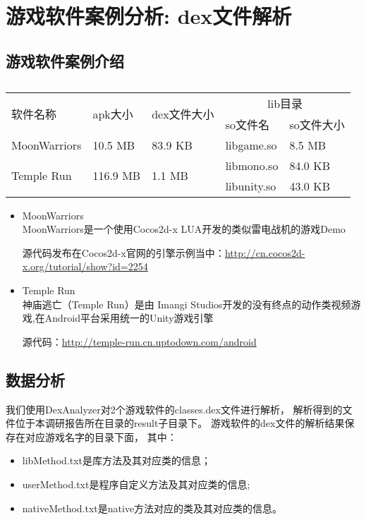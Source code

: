 \section{游戏软件案例分析: dex文件解析}
\label{dexanalysis}
\subsection{游戏软件案例介绍}
\label{sec:dexanalysis:case}
\begin{table}[H]
\caption{}
\begin{tabular}{|p{2.5cm}|p{2cm}|p{2.1cm}|p{2cm}|p{2cm}|}
\hline
\multirow{2}{*}{软件名称} & \multirow{2}{*}{apk大小}  & \multirow{2}{*}{dex文件大小} & \multicolumn{2}{|c|}{lib目录} \\
\cline{4-5}
& & & so文件名 & so文件大小\\
\hline
MoonWarriors & 10.5 MB & 83.9 KB & libgame.so & 8.5 MB \\
\hline
\multirow{2}{*}{Temple Run} & \multirow{2}{*}{116.9 MB} & \multirow{2}{*}{1.1 MB} & libmono.so & 84.0 KB\\
\cline{4-5}
& & & libunity.so & 43.0 KB\\
\hline
\end{tabular}
\end{table}

\begin{itemize}
\item MoonWarriors\\
MoonWarriors是一个使用Cocos2d-x LUA开发的类似雷电战机的游戏Demo

源代码发布在Cocos2d-x官网的引擎示例当中：\url{http://cn.cocos2d-x.org/tutorial/show?id=2254}

\item Temple Run\\
神庙逃亡（Temple Run）是由 Imangi Studios开发的没有终点的动作类视频游戏,在Android平台采用统一的Unity游戏引擎

源代码：\url{http://temple-run.cn.uptodown.com/android}

\end{itemize}

\subsection{数据分析}
\label{sec:dexanalysis:casestudy}
我们使用DexAnalyzer对2个游戏软件的classes.dex文件进行解析，
解析得到的文件位于本调研报告所在目录的result子目录下。
游戏软件的dex文件的解析结果保存在对应游戏名字的目录下面，
其中：
\begin{itemize}
\item libMethod.txt是库方法及其对应类的信息；
\item userMethod.txt是程序自定义方法及其对应类的信息;
\item nativeMethod.txt是native方法对应的类及其对应类的信息。
\end{itemize}

